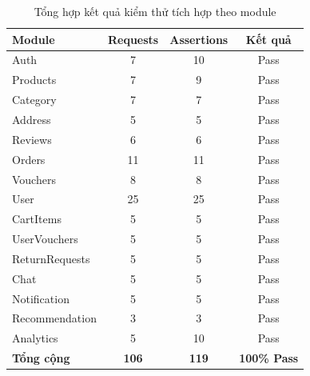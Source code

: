 \begin{table}[H]
  \centering
  \renewcommand{\arraystretch}{1.3}
  \begin{tabular}{|l|c|c|c|}
    \hline
    \textbf{Module}    & \textbf{Requests} & \textbf{Assertions} & \textbf{Kết quả}    \\
    \hline
    Auth               & 7                 & 10                  & Pass                \\
    Products           & 7                 & 9                   & Pass                \\
    Category           & 7                 & 7                   & Pass                \\
    Address            & 5                 & 5                   & Pass                \\
    Reviews            & 6                 & 6                   & Pass                \\
    Orders             & 11                & 11                  & Pass                \\
    Vouchers           & 8                 & 8                   & Pass                \\
    User               & 25                & 25                  & Pass                \\
    CartItems          & 5                 & 5                   & Pass                \\
    UserVouchers       & 5                 & 5                   & Pass                \\
    ReturnRequests     & 5                 & 5                   & Pass                \\
    Chat               & 5                 & 5                   & Pass                \\
    Notification       & 5                 & 5                   & Pass                \\
    Recommendation     & 3                 & 3                   & Pass                \\
    Analytics          & 5                 & 10                  & Pass                \\
    \hline
    \textbf{Tổng cộng} & \textbf{106}      & \textbf{119}        & \textbf{100\% Pass} \\
    \hline
  \end{tabular}
  \caption{Tổng hợp kết quả kiểm thử tích hợp theo module}
\end{table}


